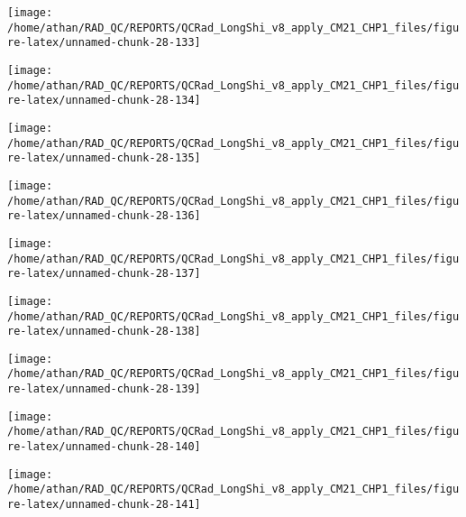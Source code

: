 \documentclass[
  10pt,
  a4paper,oneside]{article}
\begin{document}
\begin{center}\texttt{[image: /home/athan/RAD\_QC/REPORTS/QCRad\_LongShi\_v8\_apply\_CM21\_CHP1\_files/figure-latex/unnamed-chunk-28-133]} \end{center}

\begin{center}\texttt{[image: /home/athan/RAD\_QC/REPORTS/QCRad\_LongShi\_v8\_apply\_CM21\_CHP1\_files/figure-latex/unnamed-chunk-28-134]} \end{center}

\begin{center}\texttt{[image: /home/athan/RAD\_QC/REPORTS/QCRad\_LongShi\_v8\_apply\_CM21\_CHP1\_files/figure-latex/unnamed-chunk-28-135]} \end{center}

\begin{center}\texttt{[image: /home/athan/RAD\_QC/REPORTS/QCRad\_LongShi\_v8\_apply\_CM21\_CHP1\_files/figure-latex/unnamed-chunk-28-136]} \end{center}

\begin{center}\texttt{[image: /home/athan/RAD\_QC/REPORTS/QCRad\_LongShi\_v8\_apply\_CM21\_CHP1\_files/figure-latex/unnamed-chunk-28-137]} \end{center}

\begin{center}\texttt{[image: /home/athan/RAD\_QC/REPORTS/QCRad\_LongShi\_v8\_apply\_CM21\_CHP1\_files/figure-latex/unnamed-chunk-28-138]} \end{center}

\begin{center}\texttt{[image: /home/athan/RAD\_QC/REPORTS/QCRad\_LongShi\_v8\_apply\_CM21\_CHP1\_files/figure-latex/unnamed-chunk-28-139]} \end{center}

\begin{center}\texttt{[image: /home/athan/RAD\_QC/REPORTS/QCRad\_LongShi\_v8\_apply\_CM21\_CHP1\_files/figure-latex/unnamed-chunk-28-140]} \end{center}

\begin{center}\texttt{[image: /home/athan/RAD\_QC/REPORTS/QCRad\_LongShi\_v8\_apply\_CM21\_CHP1\_files/figure-latex/unnamed-chunk-28-141]} \end{center}
\end{document}
